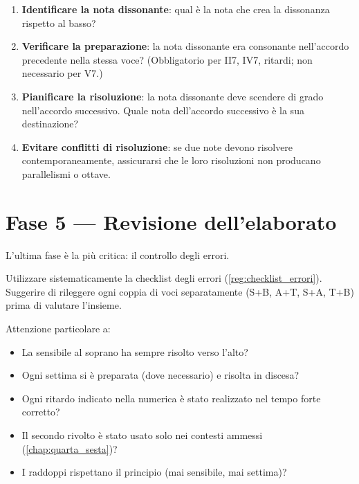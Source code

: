 \begin{regola}
	\label{reg:dissonanze_realizzazione}
	\begin{enumerate}
		\item \textbf{Identificare la nota dissonante}: qual è la nota che crea la dissonanza rispetto al basso?
		\item \textbf{Verificare la preparazione}: la nota dissonante era consonante nell'accordo precedente nella stessa voce? (Obbligatorio per II7, IV7, ritardi; non necessario per V7.)
		\item \textbf{Pianificare la risoluzione}: la nota dissonante deve scendere di grado nell'accordo successivo. Quale nota dell'accordo successivo è la sua destinazione?
		\item \textbf{Evitare conflitti di risoluzione}: se due note devono risolvere contemporaneamente, assicurarsi che le loro risoluzioni non producano parallelismi o ottave.
	\end{enumerate}
\end{regola}

\section{Fase 5 — Revisione dell'elaborato}
\label{sec:fase5_numerato}

L'ultima fase è la più critica: il controllo degli errori.

\begin{regola}
	\label{reg:revisione_numerato}
	Utilizzare sistematicamente la checklist degli errori (\ref{reg:checklist_errori}). Suggerire di rileggere ogni coppia di voci separatamente (S+B, A+T, S+A, T+B) prima di valutare l'insieme.
	
	Attenzione particolare a:
	\begin{itemize}
		\item La sensibile al soprano ha sempre risolto verso l'alto?
		\item Ogni settima si è preparata (dove necessario) e risolta in discesa?
		\item Ogni ritardo indicato nella numerica è stato realizzato nel tempo forte corretto?
		\item Il secondo rivolto è stato usato solo nei contesti ammessi (\ref{chap:quarta_sesta})?
		\item I raddoppi rispettano il principio (mai sensibile, mai settima)?
	\end{itemize}
\end{regola}

